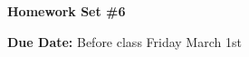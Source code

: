 
\usepackage{braket}

\def\ketY{\ensuremath{\ket {\Psi}}}
\def\iGeV{\ensuremath{\textrm{GeV}^{-1}}}
\def\mp{\ensuremath{m_{\textrm{proton}}}}
\def\rp{\ensuremath{r_{\textrm{proton}}}}
\def\me{\ensuremath{m_{\textrm{electron}}}}
\def\aG{\ensuremath{\alpha_G}}
\def\rAtom{\ensuremath{r_{\textrm{atom}}}}
\def\rNucl{\ensuremath{r_{\textrm{nucleus}}}}
\def\GN{\ensuremath{\textrm{G}_\textrm{N}}}

\def\be{\begin{equation*}}
\def\ee{\end{equation*}}


\usepackage{fancyhdr}
\usepackage{cancel}
\usepackage{ mathrsfs }





\fancyhf{}

\thispagestyle{fancy}






\begin{center}
{\huge \textbf{Homework Set \#6}}
\large

{\textbf{ Due Date:} Before class Friday March 1st  } 
\end{center}

